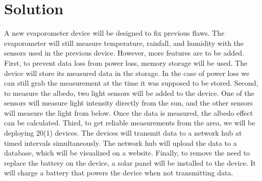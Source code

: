 \documentclass[onecolumn, draftclsnofoot,10pt, compsoc]{IEEEtran}
\begin{document}
\section {Solution}
A new evaporometer device will be designed to fix previous flaws. The evaporometer will still measure temperature, rainfall, and humidity with the sensors used in the previous device. However, more features are to be added. 
\newline
First, to prevent data loss from power loss, memory storage will be used. The device will store its measured data in the storage. In the case of power loss we can still grab the measurement at the time it was supposed to be stored.
\newline
Second, to measure the albedo, two light sensors will be added to the device. One of the sensors will measure light intensity directly from the sun, and the other sensors will measure the light from below. Once the data is measured, the albedo effect can be calculated. 
\newline
Third, to get reliable measurements from the area, we will be deploying 20(1) devices. The devices will transmit data to a network hub at timed intervals simultaneously. The network hub will upload the data to a database, which will be visualized on a website.
\newline
Finally, to remove the need to replace the battery on the device, a solar panel will be installed to the device. It will charge a battery that powers the device when not transmitting data.
\end{document}
